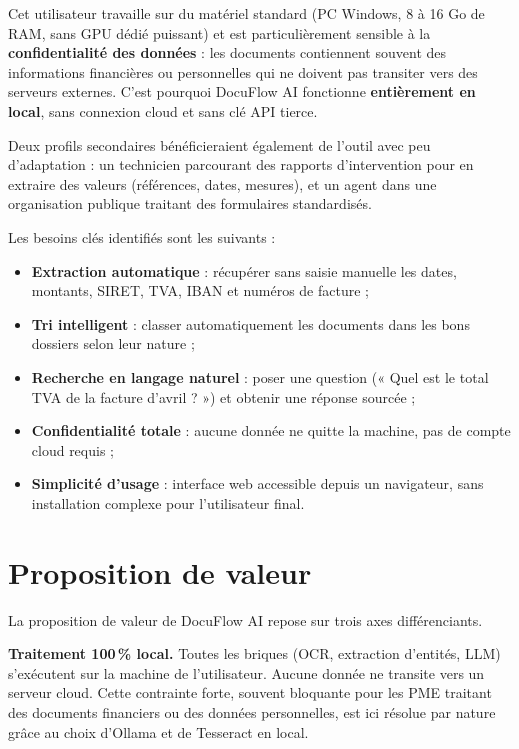 \documentclass[11pt,a4paper]{article}
\begin{document}
Cet utilisateur travaille sur du matériel standard (PC Windows, 8 à 16 Go de RAM, sans GPU dédié puissant) et est particulièrement sensible à la \textbf{confidentialité des données} : les documents contiennent souvent des informations financières ou personnelles qui ne doivent pas transiter vers des serveurs externes. C'est pourquoi DocuFlow AI fonctionne \textbf{entièrement en local}, sans connexion cloud et sans clé API tierce.

Deux profils secondaires bénéficieraient également de l'outil avec peu d'adaptation : un technicien parcourant des rapports d'intervention pour en extraire des valeurs (références, dates, mesures), et un agent dans une organisation publique traitant des formulaires standardisés.

Les besoins clés identifiés sont les suivants :

\begin{itemize}[leftmargin=*, itemsep=2pt]
  \item \textbf{Extraction automatique} : récupérer sans saisie manuelle les dates, montants, SIRET, TVA, IBAN et numéros de facture ;
  \item \textbf{Tri intelligent} : classer automatiquement les documents dans les bons dossiers selon leur nature ;
  \item \textbf{Recherche en langage naturel} : poser une question (« Quel est le total TVA de la facture d'avril ? ») et obtenir une réponse sourcée ;
  \item \textbf{Confidentialité totale} : aucune donnée ne quitte la machine, pas de compte cloud requis ;
  \item \textbf{Simplicité d'usage} : interface web accessible depuis un navigateur, sans installation complexe pour l'utilisateur final.
\end{itemize}

\section{Proposition de valeur}

La proposition de valeur de DocuFlow AI repose sur trois axes différenciants.

\textbf{Traitement 100\,\% local.} Toutes les briques (OCR, extraction d'entités, LLM) s'exécutent sur la machine de l'utilisateur. Aucune donnée ne transite vers un serveur cloud. Cette contrainte forte, souvent bloquante pour les PME traitant des documents financiers ou des données personnelles, est ici résolue par nature grâce au choix d'Ollama et de Tesseract en local.
\end{document}
